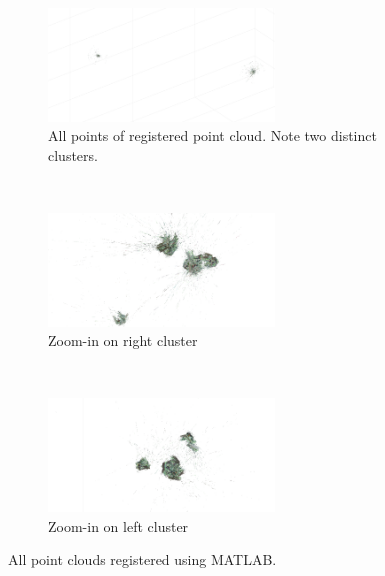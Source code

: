 \documentclass[12pt,a4paper]{article}
\begin{document}
\begin{figure}[b!]
  \centering
  \begin{subfigure}[t]{0.5\textwidth}
  \centering
    \includegraphics[width=60mm, trim =0mm 0mm 0mm 0mm, clip]{two_clusters.png}
  \caption{All points of registered point cloud. Note two distinct clusters.}
  \end{subfigure}
  \\
  \begin{subfigure}[t]{0.5\textwidth}
  \centering
    \includegraphics[width=60mm, trim =0mm 0mm 0mm 0mm, clip]{cluster1.png}
  \caption{Zoom-in on right cluster}
  \end{subfigure}%
  ~
  \begin{subfigure}[t]{0.5\textwidth}
  \centering
    \includegraphics[width=60mm, trim =0mm 0mm 0mm 0mm, clip]{cluster2.png}
  \caption{Zoom-in on left cluster}
  \end{subfigure}
  \caption{All point clouds registered using MATLAB.}
  \label{f: all registered}
\end{figure}
\end{document}
